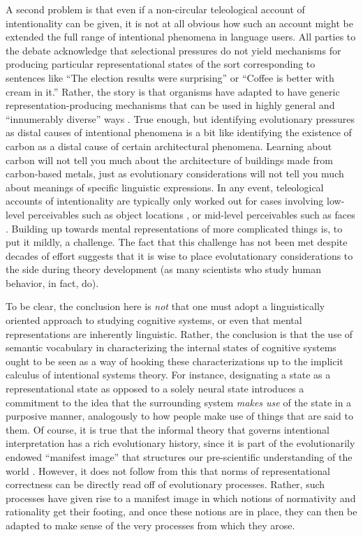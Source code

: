 A second problem is that even if a non-circular teleological account of intentionality can be given, it is not at all obvious how such an account might be extended the full range of intentional phenomena in language users. All parties to the debate acknowledge that selectional pressures do not yield mechanisms for producing particular representational states of the sort corresponding to sentences like ``The election results were surprising'' or ``Coffee is better with cream in it.'' Rather, the story is that organisms have adapted to have generic representation-producing mechanisms that can be used in highly general and ``innumerably diverse'' ways \citep[][p. 292]{Millikan:1989}. True enough, but identifying evolutionary pressures as distal causes of intentional phenomena is a bit like identifying the existence of carbon as a distal cause of certain architectural phenomena. Learning about carbon will not tell you much about the architecture of buildings made from carbon-based metals, just as evolutionary considerations will not tell you much about meanings of specific linguistic expressions. In any event, teleological accounts of intentionality are typically only worked out for cases involving low-level perceivables such as object locations \citep{Millikan:1989}, or mid-level perceivables such as faces \citep{Dennett:1987}. Building up towards mental representations of more complicated things is, to put it mildly, a challenge. The fact that this challenge has not been met despite decades of effort suggests that it is wise to place evolutationary considerations to the side during theory development (as many scientists who study human behavior, in fact, do). 

To be clear, the conclusion here is \textit{not} that one must adopt a linguistically oriented approach to studying cognitive systems, or even that mental representations are inherently linguistic. Rather, the conclusion is that the use of semantic vocabulary in characterizing the internal states of cognitive systems ought to be seen as a way of hooking these characterizations up to the implicit calculus of intentional systems theory. For instance, designating a state as a representational state as opposed to a solely neural state introduces a commitment to the idea that the surrounding system \textit{makes use} of the state in a purposive manner, analogously to how people make use of things that are said to them. Of course, it is true that the informal theory that governs intentional interpretation has a rich evolutionary history, since it is part of the evolutionarily endowed ``manifest image'' \citep{Sellars:1963} that structures our pre-scientific understanding of the world \citep{Dennett:1987}. However, it does not follow from this that norms of representational correctness can be directly read off of evolutionary processes. Rather, such processes have given rise to a manifest image in which notions of normativity and rationality get their footing, and once these notions are in place, they can then be adapted to make sense of the very processes from which they arose.


